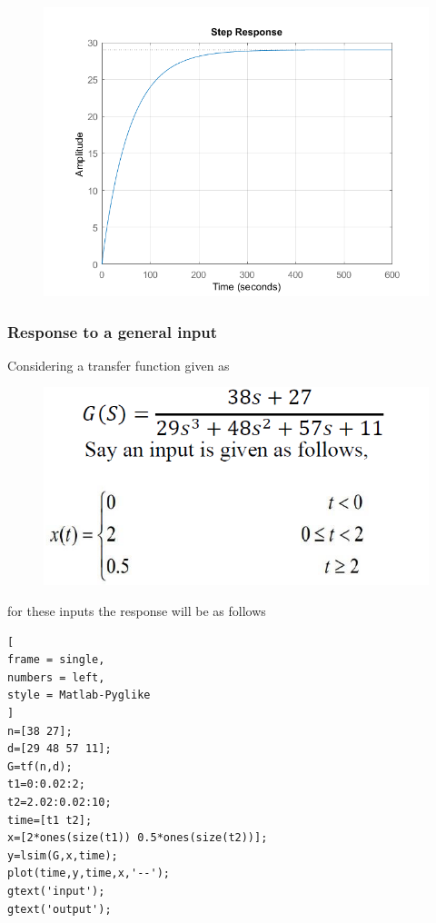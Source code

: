 \documentclass[conference]{IEEEtran}
\begin{document}
\begin{figure}[h!]
    \centering
    \includegraphics[width=\linewidth]{fig3.png}
    \label{fig:my_label}
\end{figure}


\subsubsection{Response to a general input}
Considering a transfer function given as
\begin{figure}[h!]
    \centering
    \includegraphics[width=\linewidth]{eq.png}
    \label{fig:my_label}
\end{figure}

for these inputs the response will be as follows
\begin{lstlisting}[
frame = single,
numbers = left,
style = Matlab-Pyglike
]
n=[38 27];
d=[29 48 57 11];
G=tf(n,d);
t1=0:0.02:2;
t2=2.02:0.02:10;
time=[t1 t2];
x=[2*ones(size(t1)) 0.5*ones(size(t2))];
y=lsim(G,x,time);
plot(time,y,time,x,'--');
gtext('input');
gtext('output');
\end{lstlisting}
\end{document}
